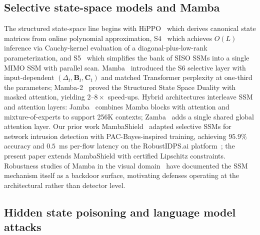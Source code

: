 \documentclass[journal,a4paper,10pt]{IEEEtran}
\theoremstyle{definition}
\theoremstyle{remark}
\begin{document}
\subsection{Selective state-space models and Mamba}

The structured state-space line begins with HiPPO~\cite{gu2020hippo} which derives canonical state matrices from online polynomial approximation, S4~\cite{gu2022s4} which achieves $O(L)$ inference via Cauchy-kernel evaluation of a diagonal-plus-low-rank parameterization, and S5~\cite{smith2023s5} which simplifies the bank of SISO SSMs into a single MIMO SSM with parallel scan. Mamba~\cite{gu2024mamba} introduced the S6 selective layer with input-dependent $(\Delta_t, \mathbf{B}_t, \mathbf{C}_t)$ and matched Transformer perplexity at one-third the parameters; Mamba-2~\cite{dao2024mamba2} proved the Structured State Space Duality with masked attention, yielding $2$--$8\times$ speed-ups. Hybrid architectures interleave SSM and attention layers: Jamba~\cite{lieber2024jamba} combines Mamba blocks with attention and mixture-of-experts to support 256K contexts; Zamba~\cite{glorioso2024zamba} adds a single shared global attention layer. Our prior work MambaShield~\cite{anaedevha2025mambashield} adapted selective SSMs for network intrusion detection with PAC-Bayes-inspired training, achieving $95.9\%$ accuracy and $0.5$~ms per-flow latency on the RobustIDPS.ai platform~\cite{anaedevha2026robustidps}; the present paper extends MambaShield with certified Lipschitz constraints. Robustness studies of Mamba in the visual domain~\cite{du2024robustness,malik2025evaluating,guo2025badvim} have documented the SSM mechanism itself as a backdoor surface, motivating defenses operating at the architectural rather than detector level.

\subsection{Hidden state poisoning and language model attacks}
\end{document}
